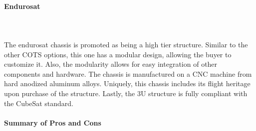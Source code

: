 \paragraph{Endurosat} ~\\~\\
The endurosat chassis is promoted as being a high tier structure. Similar to the other COTS options, this one has a modular design, allowing the buyer to customize it. Also, the modularity allows for easy integration of other components and hardware. The chassis is manufactured on a CNC machine from hard anodized aluminum alloys. Uniquely, this chassis includes its flight heritage upon purchase of the structure. Lastly, the 3U structure is fully compliant with the CubeSat standard\cite{enduro_sat}.

\paragraph{Summary of Pros and Cons}\hspace{1cm} 
